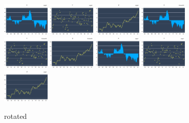 \documentclass[
]{article}
\begin{document}
\begin{figure}[h]

{\centering \includegraphics[width=0.2\textwidth,angle=90]{test_files/figure-latex//eviews12-page2-GRAPH1} \includegraphics[width=0.2\textwidth,angle=90]{test_files/figure-latex//eviews12-page2-GRAPH2} \includegraphics[width=0.2\textwidth,angle=90]{test_files/figure-latex//eviews12-page2-GRAPH3} \includegraphics[width=0.2\textwidth,angle=90]{test_files/figure-latex//eviews12-EviewsR3-GRAPH1} \includegraphics[width=0.2\textwidth,angle=90]{test_files/figure-latex//eviews12-EviewsR3-GRAPH2} \includegraphics[width=0.2\textwidth,angle=90]{test_files/figure-latex//eviews12-EviewsR3-GRAPH3} \includegraphics[width=0.2\textwidth,angle=90]{test_files/figure-latex//eviews12-page1-GRAPH1} \includegraphics[width=0.2\textwidth,angle=90]{test_files/figure-latex//eviews12-page1-GRAPH2} \includegraphics[width=0.2\textwidth,angle=90]{test_files/figure-latex//eviews12-page1-GRAPH3} 

}

\caption{rotated}\label{fig:eviews12}
\end{figure}
\end{document}

